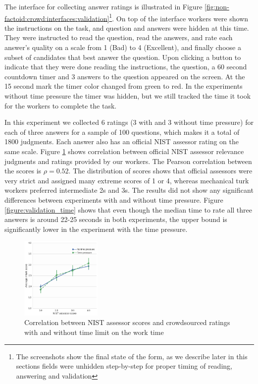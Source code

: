 The interface for collecting answer ratings is illustrated in Figure \ref{fig:non-factoid:crowd:interfaces:validation}\footnote{The screenshots show the final state of the form, as we describe later in this sections fields were unhidden step-by-step for proper timing of reading, answering and validation}.
On top of the interface workers were shown the instructions on the task, and question and answers were hidden at this time.
They were instructed to read the question, read the answers, and rate each answer's quality on a scale from 1 (Bad) to 4 (Excellent), and finally choose a subset of candidates that best answer the question.
Upon clicking a button to indicate that they were done reading the instructions, the question, a 60 second countdown timer and 3 answers to the question appeared on the screen.
At the 15 second mark the timer color changed from green to red.
In the experiments without time pressure the timer was hidden, but we still tracked the time it took for the workers to complete the task.

In this experiment we collected 6 ratings (3 with and 3 without time pressure) for each of three answers for a sample of 100 questions, which makes it a total of 1800 judgments.
Each answer also has an official NIST assessor rating on the same scale.
Figure \ref{figure:score_correlation} shows correlation between official NIST assessor relevance judgments and ratings provided by our workers.
The Pearson correlation between the scores is $\rho=0.52$.
The distribution of scores shows that official assessors were very strict and assigned many extreme scores of 1 or 4, whereas mechanical turk workers preferred intermediate 2s and 3s.
The results did not show any significant differences between experiments with and without time pressure.
Figure \ref{figure:validation_time} shows that even though the median time to rate all three answers is around 22-25 seconds in both experiments, the upper bound is significantly lower in the experiment with the time pressure.

\begin{figure}[t!]
	\centering
	\includegraphics[width=0.35\textwidth]{img/score_correlation}
	\caption{Correlation between NIST assessor scores and crowdsourced ratings with and without time limit on the work time}
	\label{figure:score_correlation}
\end{figure}

